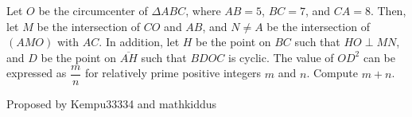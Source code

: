Let $O$ be the circumcenter of $\Delta ABC$, where $AB = 5$, $BC = 7$, and $CA = 8$. Then, let $M$ be the intersection of $CO$ and $AB$, and $N \neq A$ be the intersection of $(AMO)$ with $AC$. In addition, let $H$ be the point on $BC$ such that $HO \perp MN$, and $D$ be the point on $\overline{AH}$ such that $BDOC$ is cyclic. The value of $OD^2$ can be expressed as $\dfrac{m}{n}$ for relatively prime positive integers $m$ and $n$. Compute $m+n$.



 Proposed by Kempu33334 and mathkiddus
